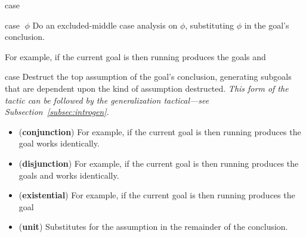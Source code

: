 \begin{tactic}{case}
  \begin{tsyntax}{case $\;\phi$}
    Do an excluded-middle case analysis on $\phi$, substituting $\phi$
    in the goal's conclusion.

    For example, if the current goal is
     then
    running 
    produces the goals
    and
  \end{tsyntax}

  \begin{tsyntax}{case}
    Destruct the top assumption of the goal's conclusion, generating
    subgoals that are dependent upon the kind of assumption
    destructed. \emph{This form of the tactic can be followed by
    the generalization tactical---see Subsection~\ref{subsec:introgen}.}

    \begin{itemize}
    \item (\textbf{conjunction})
    For example, if the current goal is
     then
    running 
    produces the goal
    \ec{&&} works identically.

    \item (\textbf{disjunction})
    For example, if the current goal is
     then
    running 
    produces the goals
    and
    \ec{||} works identically.

    \item (\textbf{existential})
    For example, if the current goal is
     then
    running 
    produces the goal

    \item (\textbf{unit}) Substitutes  for the assumption in
      the remainder of the conclusion.


\end{itemize}
\end{tsyntax}
\end{tactic}
